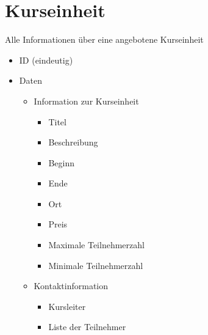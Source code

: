 \documentclass[a4paper]{scrreprt}
\newcounter{Lc}
\newcounter{Hc}
\newcommand{\stepHc}{\stepcounter{Hc}\setcounter{Lc}{0}}
\begin{document}
\section{Kurseinheit}
\Func {} Alle Informationen über eine angebotene Kurseinheit
\begin{itemize}
	\item ID (eindeutig)
	\item Daten
	\begin{itemize}
		\item Information zur Kurseinheit
		\begin{itemize}
			\item Titel 
			\item Beschreibung 
			\item Beginn 
			\item Ende 
			\item Ort 
			\item Preis 
			\item Maximale Teilnehmerzahl 
			\item Minimale Teilnehmerzahl 			
		\end{itemize}
		\item Kontaktinformation
		\begin{itemize}
			\item Kursleiter 
			\item Liste der Teilnehmer 
		\end{itemize}
	\end{itemize}
	
	
	
\end{itemize}   


\stepHc	   		
\end{document}
